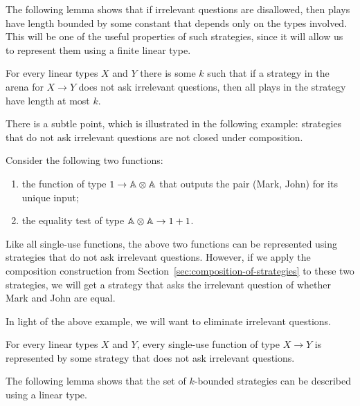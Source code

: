 The following lemma shows that if irrelevant questions are disallowed, then plays have length bounded by some constant that depends only on the types involved. This will be one of the useful properties of such strategies, since it will allow us to represent them using a finite linear type.

\begin{lemma}\label{lem:no-irrelevant-questions-are-bounded}
    For every linear types $X$ and $Y$ there is some $k$ such that if a strategy in the arena for $X \to Y$ does not ask irrelevant questions, then all plays in the strategy have length at most $k$.
\end{lemma}

There is a subtle point, which is illustrated in the following example:  strategies that do not ask irrelevant questions are not closed under composition. 

\begin{example}
    Consider the  following two functions: 
    \begin{enumerate}
        \item the function of type  $1 \to \mathbb A \otimes \mathbb A$ that outputs the pair (Mark, John) for its unique input;
        \item the equality test of type $\mathbb A \otimes \mathbb A \to 1 + 1$.
    \end{enumerate}
    Like all single-use functions, the above two functions can be represented using strategies that do not ask irrelevant questions. However, if we apply the composition construction from Section~\ref{sec:composition-of-strategies} to these two strategies, we will get a strategy that asks the irrelevant question of whether Mark and John are equal. \exampleend
\end{example}

In light of the above example, we will want to eliminate irrelevant questions. 

\begin{lemma}\label{lem:eliminate-irrelevant-questions}
    For every linear types $X$ and $Y$, every single-use function of type  $X \to Y$ is represented by  some strategy that does not ask irrelevant questions.
\end{lemma}


The following lemma shows that the set of $k$-bounded strategies can be described using a linear type.

